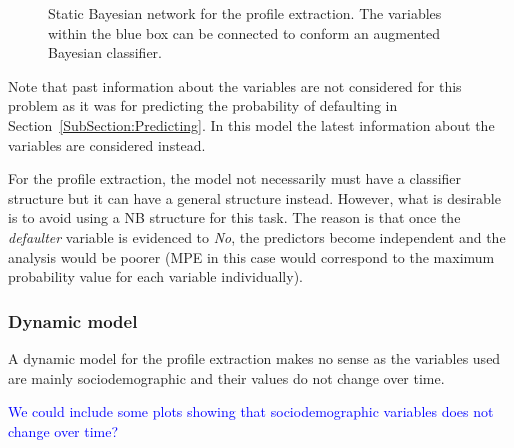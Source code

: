 \begin{figure}[h]
\centering
{}
\caption{Static Bayesian network for the profile extraction. The variables within the blue box can be connected to conform an augmented Bayesian classifier.}
\label{fig:StaticBNProfile}
\end{figure}




Note that past information about the variables are not considered for this problem as it was for predicting the probability of defaulting in Section~\ref{SubSection:Predicting}. In this model the latest information about the variables are considered instead.

For the profile extraction, the model not necessarily must have a classifier structure but it can have a general structure instead. However, what is desirable is to avoid using a NB structure for this task. The reason is that once the \emph{defaulter} variable is evidenced to \emph{No}, the predictors become independent and the analysis would be poorer (MPE in this case would correspond to the maximum probability value for each variable individually).



\subsubsection*{Dynamic model}

A dynamic model for the profile extraction makes no sense as the variables used are mainly sociodemographic and their values do not change over time.

\textcolor{blue}{We could include some plots showing that sociodemographic variables does not change over time?}

